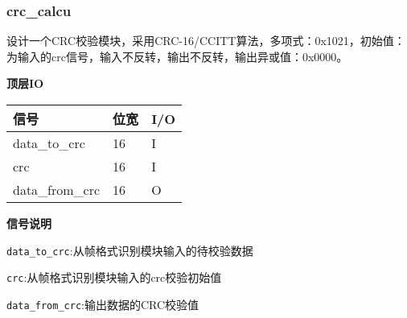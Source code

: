 \documentclass[12pt,]{article}
\begin{document}
\hypertarget{crc_calcu}{%
\subsubsection{crc\_calcu}\label{crc_calcu}}

设计一个CRC校验模块，采用CRC-16/CCITT算法，多项式：0x1021，初始值：为输入的crc信号，输入不反转，输出不反转，输出异或值：0x0000。

\textbf{顶层IO}

\begin{longtable}[]{@{}lll@{}}
\toprule\noalign{}
信号 & 位宽 & I/O \\
\midrule\noalign{}
\endhead
\bottomrule\noalign{}
\endlastfoot
data\_to\_crc & 16 & I \\
crc & 16 & I \\
data\_from\_crc & 16 & O \\
\end{longtable}

\textbf{信号说明}


\texttt{data\_to\_crc}:从帧格式识别模块输入的待校验数据

\texttt{crc}:从帧格式识别模块输入的crc校验初始值

\texttt{data\_from\_crc}:输出数据的CRC校验值
\end{document}
